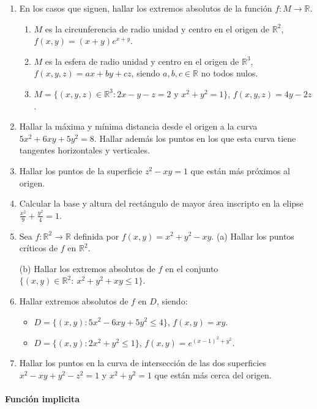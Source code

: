 \documentclass[11pt]{book}
\newcommand{\R}{\mathbb{R}}
\theoremstyle{definicion}
\theoremstyle{teorema}
\theoremstyle{ejemplo}
\begin{document}
\begin{enumerate}

\item
En los casos que siguen, hallar los extremos absolutos de la función $f:M\to\R$.
\begin{enumerate}
\item
$M$ es la circunferencia de  radio unidad y centro en el origen de $\R^2$, $f(x,y)=(x+y)e^{x+y}$.
\item
$M$ es  la esfera de radio unidad y centro en el origen de $\R^3$, $f(x,y,z)=ax+by+cz$, siendo $a,b,c\in \R$ no todos nulos.
\item
$M=\{(x,y,z)\in\R^3:2x-y-z=2\text{ y }x^2+y^2=1\}$, $f(x,y,z)=4y-2z$.
\end{enumerate}

\item
Hallar la m\'axima y mínima distancia desde el origen a la curva 
$5x^2 +6xy +5y^2=8$. 
Hallar adem\'as los puntos en los que esta curva tiene tangentes horizontales y verticales.
 

\item 
Hallar los puntos de la superficie $z^2-xy=1$ que est\'an m\'as pr\'oximos al origen.
 
\item
Calcular la base y altura del rectángulo de mayor área inscripto en la elipse $\frac{x^2}9+\frac{y^2}4=1$.


\item
Sea $f:\R^2\to\R$ definida por $f(x,y)= x^2+ y^2-xy$.
\vskip1mm\noindent
(a) Hallar los puntos críticos de $f$ en $\R^2$.
\vskip1mm\noindent

(b) Hallar los extremos absolutos de $f$ en el conjunto $\{(x,y)\in\R^2:\ x^2+y^2+xy\leq 1\}$.
 

\item
Hallar extremos absolutos de $f$ en $D$, siendo:
\begin{itemize}
\item[(a)]$D=\{ (x,y)\colon 5x^2 -6xy +5y^2 \leq 4 \}$, $f(x,y)=xy$.
\item[(b)] $D=\{ (x,y)\colon 2x^2 +y^2 \leq 1\}$, $f(x,y)=e^{(x-1)^2+y^2}$.
\end{itemize}

\item Hallar los puntos en la curva de intersección de las dos superficies
$x^2-xy+y^2-z^2=1$ y $x^2+y^2=1$ que están más cerca del origen.
\end{enumerate}

\paragraph{Funci\'on implicita}
\end{document}
